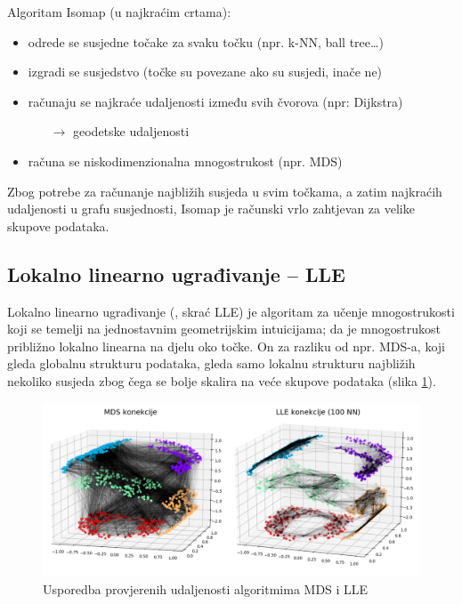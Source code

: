 \documentclass[times, utf8, diplomski]{fer}
\begin{document}
Algoritam Isomap (u najkraćim crtama):
\begin{itemize}
    \item odrede se susjedne točake za svaku točku (npr. k-NN, ball tree\dots)
    \item izgradi se susjedstvo (točke su povezane ako su susjedi, inače ne)
    \item računaju se najkraće udaljenosti između svih čvorova (npr: Dijkstra)
          \begin{itemize}
              \item[$\rightarrow$] geodetske udaljenosti
          \end{itemize}
    \item računa se niskodimenzionalna mnogostrukost (npr. MDS)
\end{itemize}

\bigskip
Zbog potrebe za računanje najbližih susjeda u svim točkama, a zatim najkraćih udaljenosti u grafu susjednosti, Isomap je računski vrlo zahtjevan za velike skupove podataka.

\subsection{Lokalno linearno ugrađivanje -- LLE}
Lokalno linearno ugrađivanje (, skrać LLE) je algoritam za učenje mnogostrukosti koji se temelji na jednostavnim geometrijskim intuicijama; da je mnogostrukost približno lokalno linearna na djelu oko točke. On za razliku od npr. MDS-a, koji gleda globalnu strukturu podataka, gleda samo lokalnu strukturu najbližih nekoliko susjeda zbog čega se bolje skalira na veće skupove podataka (slika \ref{fig:connections}).

\begin{figure}[htb]
    \centering
    \includegraphics[width=\textwidth]{resources/images/reduction/connections.png}
    \caption{Usporedba provjerenih udaljenosti algoritmima MDS i LLE}
    \label{fig:connections}
\end{figure}
\end{document}
